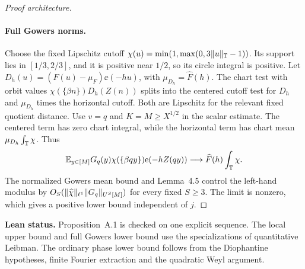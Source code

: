 \begin{proof}[Proof architecture]
\paragraph{Full Gowers norms.}
Choose the fixed Lipschitz cutoff
$\chi(u)=\min(1,\max(0,3\lVert u\rVert_{\mathbb T}-1))$. Its support lies in
$[1/3,2/3]$, and it is positive near $1/2$, so its circle
integral is positive. Let
$D_h(u)=(F(u)-\mu_F)\ee(-hu)$, with
$\mu_{D_h}=\widehat F(h)$. The chart test with orbit values
$\chi(\{\beta n\})D_h(Z(n))$ splits into the centered
cutoff test for $D_h$ and $\mu_{D_h}$ times the horizontal cutoff.
Both are Lipschitz for the relevant fixed quotient distance.
Use $v=q$ and $K=M\ge X^{1/2}$ in the scalar estimate.
The centered term has zero chart integral, while the horizontal
term has chart mean $\mu_{D_h}\int_\mathbb T\chi$. Thus
\[
 \mathbb E_{y\in[M]}G_q(y)\chi(\{\beta qy\})\mathrm e(-hZ(qy))
 \longrightarrow \widehat F(h)\int_\mathbb T\chi .
\]
The normalized Gowers mean bound and Lemma~4.5 control the
left-hand modulus by
$O_S(\lVert\widehat\chi\rVert_{\ell^1}\lVert G_q\rVert_{U^S[M]})$ for every
fixed $S\ge3$. The limit is nonzero, which gives a positive
lower bound independent of $j$.
\end{proof}
\noindent\textbf{Lean status.} Proposition~A.1 is checked on one
explicit sequence. The local upper bound and full Gowers lower bound use the
specializations of quantitative Leibman. The ordinary phase lower
bound follows from the Diophantine hypotheses, finite Fourier
extraction and the quadratic Weyl argument.

